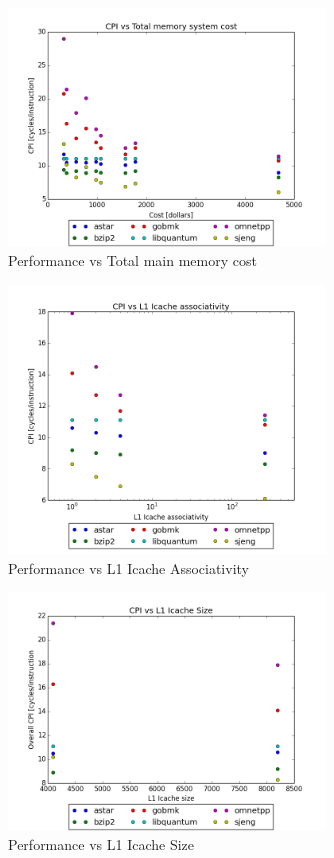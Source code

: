 \documentclass{article}
\begin{document}
\begin{figure}[ht]
    \centering
    \includegraphics[width=0.75\textwidth]{plots/CPI_vs_Total_memory_system_cost.png}
    \caption{Performance vs Total main memory cost}
    \label{fig:cpivstotalcost}
\end{figure}

\begin{figure}[ht]
    \centering
    \includegraphics[width=0.75\textwidth]{plots/CPI_vs_L1icache_assoc.png}
    \caption{Performance vs L1 Icache Associativity}
    \label{fig:cpivsl1iassoc}
\end{figure}

\begin{figure}[ht]
    \centering
    \includegraphics[width=0.75\textwidth]{plots/CPI_vs_L1icache_size.png}
    \caption{Performance vs L1 Icache Size}
    \label{fig:cpivsl1isize}
\end{figure}
\end{document}
